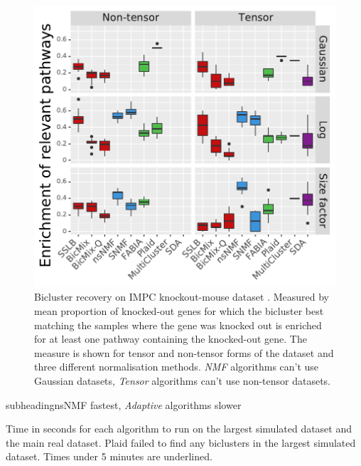 \documentclass[xcolor=table,final]{beamer}
\newlength{\onecolwid}
\newlength{\twocolwid}
\newcommand{\kcnsubheading}[1]{\begin{beamercolorbox}[rounded=true,sep=0.5ex]{subheading}{\large #1}\end{beamercolorbox}}
\begin{document}
\begin{frame}[t]
\begin{columns}[t]
\begin{column}{\twocolwid}
\begin{columns}[t]
\begin{column}{\onecolwid}
\begin{figure}
\includegraphics[width=\textwidth]{plots/compare_samegenes_K_50_datasets_ko_traits_nz_alpha_0-05.pdf}
\caption{Bicluster recovery on IMPC knockout-mouse dataset \cite{koscielny_international_2014}. Measured by mean proportion of knocked-out genes for which the bicluster best matching the samples where the gene was knocked out is enriched for at least one pathway containing the knocked-out gene. The measure is shown for tensor and non-tensor forms of the dataset and three different normalisation methods. \textit{NMF} algorithms can't use Gaussian datasets, \textit{Tensor} algorithms can't use non-tensor datasets.}
\end{figure}


\kcnsubheading{nsNMF fastest, \textit{Adaptive} algorithms slower}

\begin{table}[t!]
\caption{Time in seconds for each algorithm to run on the largest simulated dataset and the main real dataset. Plaid failed to find any biclusters in the largest simulated dataset. Times under 5 minutes are underlined.}


\end{table}
\end{column}
\end{columns}
\end{column}
\end{columns}
\end{frame}
\end{document}
